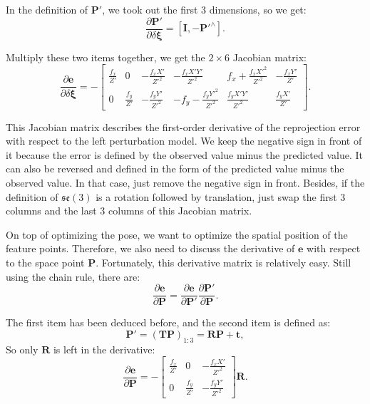 In the definition of $\mathbf{P}'$, we took out the first 3 dimensions, so we get:
\begin{equation}
\frac{{\partial \mathbf{P}'}}{{\partial \delta \boldsymbol{\xi} }} = \left[ { \mathbf{I}, - {\mathbf{P}'^ \wedge }} \right].
\end{equation}

Multiply these two items together, we get the $2 \times 6$ Jacobian matrix:
\begin{equation}
\label{eq:jacob-uv2xi}
\frac{{\partial \mathbf{e}}}{{\partial \delta \boldsymbol{\xi} }} = - \left[ {\begin{array}{*{20}{c}}
	{\frac{{{f_x}}}{Z'}}&0&{ - \frac{{{f_x}X'}}{{{Z'^2}}}}&{ - \frac{{{f_x}X'Y'}}{{{Z'^2}}}}&{{f_x} + \frac{{{f_x}{X'^2}}}{{{Z'^2}}}}&{ - \frac{{{f_x}Y'}}{Z'}}\\
	0&{\frac{{{f_y}}}{Z'}}&{ - \frac{{{f_y}Y'}}{{{Z'^2}}}}&{ - {f_y} - \frac{{{f_y}{Y'^2}}}{{{Z'^2}}}}&{\frac{{{f_y}X'Y'}}{{{Z'^2}}}}&{\frac{{{f_y}X'}}{Z'}}
	\end{array}} \right].
\end{equation}

This Jacobian matrix describes the first-order derivative of the reprojection error with respect to the left perturbation model. We keep the negative sign in front of it because the error is defined by the observed value minus the predicted value. It can also be reversed and defined in the form of the predicted value minus the observed value. In that case, just remove the negative sign in front. Besides, if the definition of $\mathfrak{se}(3)$ is a rotation followed by translation, just swap the first 3 columns and the last 3 columns of this Jacobian matrix.

On top of optimizing the pose, we want to optimize the spatial position of the feature points. Therefore, we also need to discuss the derivative of $\mathbf{e}$ with respect to the space point $\mathbf{P}$. Fortunately, this derivative matrix is relatively easy. Still using the chain rule, there are:
\begin{equation}
\frac{{\partial \mathbf{e}}}{{\partial \mathbf{P} }} = \frac{{\partial \mathbf{e}}}{{\partial \mathbf{P}'}}\frac{{\partial \mathbf{P}'}}{{\partial \mathbf{P} }}.
\end{equation}

The first item has been deduced before, and the second item is defined as:
\[
\mathbf{P}'= (\mathbf{T} \mathbf{P})_{1:3} = \mathbf{R} \mathbf{P} + \mathbf{t},
\]
So only $\mathbf{R}$ is left in the derivative:
\begin{equation}
\label{eq:jacob-uv2P}
\frac{{\partial \mathbf{e}}}{{\partial \mathbf{P} }} = -\left[ 
\begin{array}{*{20}{c}}
	\frac{f_x}{Z'} & 0 &- \frac{f_x X'}{Z'^2} \\
	0 & \frac{f_y}{Z'} & - \frac{f_y Y'}{Z'^2}
\end{array} \right] \mathbf{R}.
\end{equation}

